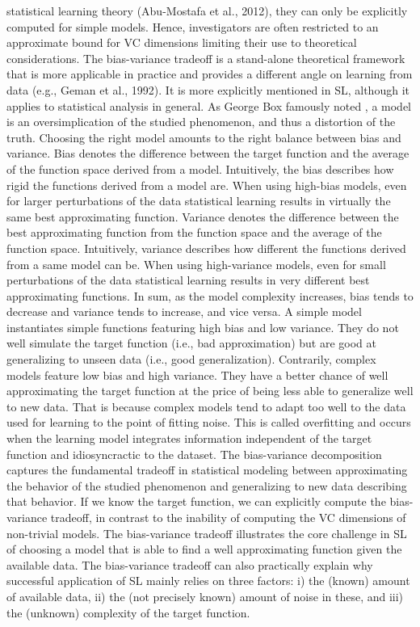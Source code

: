 \documentclass[authoryear,review,3p]{elsarticle}
\begin{document}
statistical learning theory (Abu-Mostafa et al., 2012), they can only be explicitly computed for simple models. Hence, investigators are often restricted to an approximate bound for VC dimensions limiting their use to theoretical considerations.
The bias-variance tradeoff is a stand-alone theoretical framework that is more applicable in practice and provides a different angle on learning from data (e.g., Geman et al., 1992). It is more explicitly mentioned in SL, although it applies to statistical analysis in general. As George Box famously noted , a model is an oversimplication of the studied phenomenon, and thus a distortion of the truth. Choosing the right model amounts to the right balance between bias and variance. Bias denotes the difference between the target function and the average of the function space derived from a model. Intuitively, the bias describes how rigid the functions derived from a model are. When using high-bias models, even for larger perturbations of the data statistical learning results in virtually the same best approximating function. Variance denotes the difference between the best approximating function from the function space and the average of the function space. Intuitively, variance describes how different the functions derived from a same model can be. When using high-variance models, even for small perturbations of the data statistical learning results in very different best approximating functions. In sum, as the model complexity increases, bias tends to decrease and variance tends to increase, and vice versa. A simple model instantiates simple functions featuring high bias and low variance. They do not well simulate the target function (i.e., bad approximation) but are good at generalizing to unseen data (i.e., good generalization). Contrarily, complex models feature low bias and high variance. They have a better chance of well approximating the target function at the price of being less able to generalize well to new data. That is because complex models tend to adapt too well to the data used for learning to the point of fitting noise. This is called overfitting and occurs when the learning model integrates information independent of the target function and idiosyncractic to the dataset. The bias-variance decomposition captures the fundamental tradeoff in statistical modeling between approximating the behavior of the studied phenomenon and generalizing to new data describing that behavior. If we know the target function, we can explicitly compute the bias-variance tradeoff, in contrast to the inability of computing the VC dimensions of non-trivial models. The bias-variance tradeoff illustrates the core challenge in SL of choosing a model that is able to find a well approximating function given the available data. The bias-variance tradeoff can also practically explain why successful application of SL mainly relies on three factors: i) the (known) amount of available data, ii) the (not precisely known) amount of noise in these, and iii) the (unknown) complexity of the target function.
\end{document}
